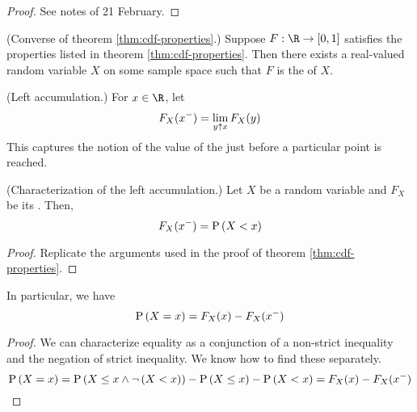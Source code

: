 \documentclass[11pt]{article}
\begin{document}
\begin{proof}
    See notes of 21 February.
\end{proof}

\begin{thm}{(Converse of theorem \ref{thm:cdf-properties}.)}
    \label{thm:cdf-properties-converse}
    Suppose $F : \R \to \unit$ satisfies the properties listed in theorem
    \ref{thm:cdf-properties}. Then there exists a real-valued random variable
    $X$ on some sample space such that $F$ is the \cdf{} of $X$.
\end{thm}

\omittedproof

\begin{defn}{(Left accumulation.)}
    \label{def:left-acc}
    For $x \in \R$, let
    \begin{equation}
        \label{eq:left-acc}
        F_X (x^-) = \lim_{y \mathbin{\uparrow} x} {
            F_X (y)
        }
    \end{equation}
    This captures the notion of the value of the \cdf{} just before a
    particular point is reached.
\end{defn}

\begin{thm}{(Characterization of the left accumulation.)}
    \label{thm:characterization-left-acc}
    Let $X$ be a random variable and $F_X$ be its \cdf.
    Then,
    \begin{equation}
        \label{eq:left-acc-strict-inequality}
        F_X(x^-) = \operatorname{P}{\left(X < x\right)}
    \end{equation}
\end{thm}

\begin{proof}
    Replicate the arguments used in the proof of theorem
    \ref{thm:cdf-properties}.
\end{proof}

\begin{cor}
    In particular, we have
    \begin{equation}
        \label{eq:left-acc-equality}
        \operatorname{P}{\left(X = x\right)} = F_X (x) - F_X(x^-)
    \end{equation}
\end{cor}

\begin{proof}
    We can characterize equality as a conjunction of a non-strict inequality
    and the negation of strict inequality. We know how to find these
    separately.
    \begin{equation*}
        \operatorname{P}{\left(X = x\right)}
        = \operatorname{P}{\left(X \leq x \land \neg \left(X < x\right)\right)}
        - \operatorname{P}{\left(X \leq x\right)} - \operatorname{P}{\left(X < x\right)}
        = F_X(x) - F_X(x^-)
    \end{equation*}
\end{proof}
\end{document}

